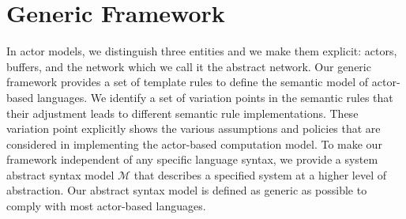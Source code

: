 \section{Generic Framework}\label{sec::generic}
In actor models, we distinguish three entities and we make them explicit: actors, buffers, and the network which we call it the abstract network. Our generic framework provides a set of template rules to define the semantic model of actor-based languages. We identify a set of variation points in the semantic rules that their adjustment leads to different semantic rule implementations. These variation point explicitly shows the various assumptions and policies that are considered in implementing the actor-based computation model. %
To make our framework independent of any specific language syntax, we provide a system abstract syntax model $\mathcal{M}$ that describes a specified system at a higher level of abstraction. Our abstract syntax model is defined as generic as possible to comply with most actor-based languages.

